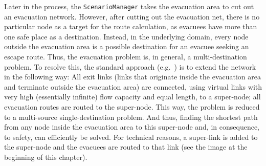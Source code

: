 Later in the process, the \lstinline|ScenarioManager| takes the evacuation area to cut out an evacuation network. However, after cutting out the evacuation net, there is no particular node as a target for the route calculation, as evacuees have more than one safe place as a destination. Instead, in the underlying domain, every node outside the evacuation area is a possible destination for an evacuee seeking an escape route. Thus, the evacuation problem is, in general, a multi-destination problem. To resolve this, the standard approach (e.g.~\citet{FordFulkerson1962FlowsInNetworks,LuGeorgeEtAl2005CapacityConstrainedRouting}) is to extend the network in the following way: All exit links (\ie links that originate inside the evacuation area and terminate outside the evacuation area) are connected, using virtual links with very high (essentially infinite) flow capacity and equal length, to a super-node; all evacuation routes are routed to the super-node. This way, the problem is reduced to a multi-source single-destination problem. And thus, finding the shortest path from any node inside the evacuation area to this super-node and, in consequence, to safety, can efficiently be solved. For technical reasons, a super-link is added to the super-node and the evacuees are routed to that link (see the image at the beginning of this chapter).

